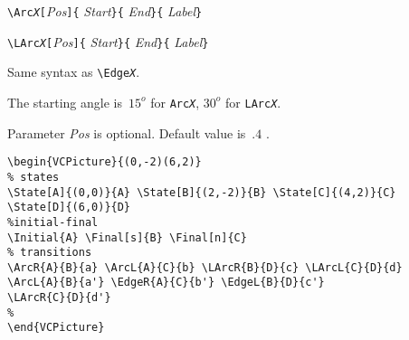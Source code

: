 \documentclass[11pt,twoside]{article}
\newlength{\ColoText}%
\newlength{\ColoFigu}%
\newlength{\parindenttemp} %
\newcommand{\noi}{\noindent}
\newlength{\jsIndent}%
\newlength{\ColSource}%
\newlength{\ColFigur}%
\begin{document}
\noi 
\hspace*{-\jsIndent}
\begin{minipage}[t]{\ColoText}
        \par\vspace*{0mm}%
\medskip 
        \footnotesize
\verb+\Arc+\texttt{\textsl{X}}\verb+[+\textsl{Pos}\verb+]{+%
   \textsl{Start}\verb+}{+%
   \textsl{End}\verb+}{+%
   \textsl{Label}\verb+}+
   
\medskip 
\verb+\LArc+\texttt{\textsl{X}}\verb+[+\textsl{Pos}\verb+]{+%
   \textsl{Start}\verb+}{+%
   \textsl{End}\verb+}{+%
   \textsl{Label}\verb+}+
   \normalsize
\end{minipage}%
\hspace*{1.2em}%
\begin{minipage}[t]{\ColoFigu}%
\par\vspace*{0mm}%
Same syntax as \verb+\Edge+\texttt{\textsl{X}}. 

The starting angle is~$15^o$ for \verb+Arc+\texttt{\textsl{X}}, 
$30^o$ for \verb+LArc+\texttt{\textsl{X}}\verb++. 

Parameter {\sl Pos} is optional. 
Default value is~$.4$ .
\end{minipage}%

\medskip 

\noi 
\hspace*{-\jsIndent}
\begin{minipage}[c]{\ColFigur}%
\par\vspace*{0mm}%
\bigskip 
\begin{center}
%
\end{center}
\end{minipage}%
\hspace*{1.2em}%
\begin{minipage}[c]{\ColSource}
\setlength{\parindent}{\parindenttemp}%
\par\vspace*{0mm}%
\footnotesize
\begin{verbatim}
\begin{VCPicture}{(0,-2)(6,2)}
% states
\State[A]{(0,0)}{A} \State[B]{(2,-2)}{B} \State[C]{(4,2)}{C}
\State[D]{(6,0)}{D}
%initial-final
\Initial{A} \Final[s]{B} \Final[n]{C}
% transitions 
\ArcR{A}{B}{a} \ArcL{A}{C}{b} \LArcR{B}{D}{c} \LArcL{C}{D}{d}
\ArcL{A}{B}{a'} \EdgeR{A}{C}{b'} \EdgeL{B}{D}{c'}
\LArcR{C}{D}{d'}
%
\end{VCPicture}
\end{verbatim}
\normalsize
\end{minipage}%
\end{document}
